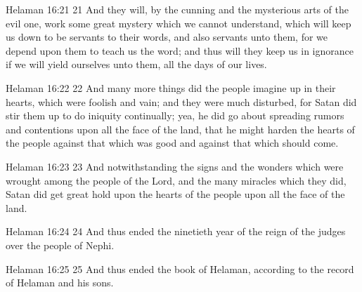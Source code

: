 Helaman 16:21
 21 And they will, by the cunning and the mysterious arts of the
evil one, work some great mystery which we cannot understand,
which will keep us down to be servants to their words, and also
servants unto them, for we depend upon them to teach us the word;
and thus will they keep us in ignorance if we will yield
ourselves unto them, all the days of our lives.

Helaman 16:22
 22 And many more things did the people imagine up in their
hearts, which were foolish and vain; and they were much
disturbed, for Satan did stir them up to do iniquity continually;
yea, he did go about spreading rumors and contentions upon all
the face of the land, that he might harden the hearts of the
people against that which was good and against that which should
come.

Helaman 16:23
 23 And notwithstanding the signs and the wonders which were
wrought among the people of the Lord, and the many miracles which
they did, Satan did get great hold upon the hearts of the people
upon all the face of the land.

Helaman 16:24
 24 And thus ended the ninetieth year of the reign of the judges
over the people of Nephi.

Helaman 16:25
 25 And thus ended the book of Helaman, according to the record
of Helaman and his sons.




